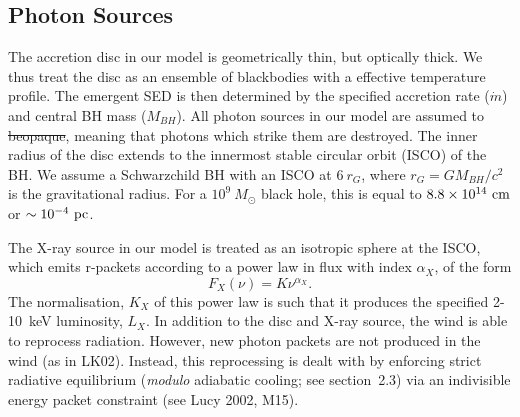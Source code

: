 \documentclass[useAMS,usenatbib]{mn2e_x}
\providecommand{\DIFadd}[1]{{\protect\color{blue}\uwave{#1}}} %
\providecommand{\DIFdel}[1]{{\protect\color{red}\sout{#1}}}                      %
\providecommand{\DIFaddbegin}{} %
\providecommand{\DIFaddend}{} %
\providecommand{\DIFdelbegin}{} %
\providecommand{\DIFdelend}{} %
\begin{document}
\DIFdelbegin %


\DIFdelend \subsection{Photon Sources}

\DIFdelbegin %

\DIFdelend The accretion disc in our model is geometrically thin, but optically thick.
We thus treat the disc as an ensemble of blackbodies with a 
\cite{shakurasunyaev1973} effective temperature profile. 
The emergent SED is then determined by the specified accretion rate ($\dot{m}$)
and central BH mass ($M_{BH}$).
All photon sources in our model are assumed to \DIFdelbegin \DIFdel{beopaque}\DIFdelend \DIFaddbegin \DIFadd{be opaque}\DIFaddend , meaning
that photons which strike them are destroyed.
The inner radius of the disc extends to the innermost 
stable circular orbit (ISCO) of the BH. 
We assume a Schwarzchild BH with an ISCO at $6~r_G$, where 
$r_G = GM_{BH}/c^2$ is the gravitational radius.
For a $10^9~M_\odot$ black hole, this is equal to $8.8\times10^{14}~{\rm cm}$ 
or $\sim10^{-4}~{\rm pc}$.  


The X-ray source in our model is treated as an isotropic sphere at the ISCO,
which emits r-packets according to a power law in flux with index $\alpha_X$, of the form
\begin{equation}
F_X (\nu) = K \nu^{\alpha_X}.
\end{equation}
The normalisation, $K_X$ of this power law is such that it 
produces the specified 2-10~keV luminosity, $L_X$.
In addition to the disc and X-ray source, 
the wind is able to reprocess radiation. However, new 
photon packets are not produced in the wind (as in LK02). 
Instead, this reprocessing is dealt with by enforcing strict
radiative equilibrium ({\em modulo} adiabatic cooling; see section~2.3)
via an indivisible energy packet
constraint (see Lucy 2002, M15).

\DIFdelbegin %
\end{document}
